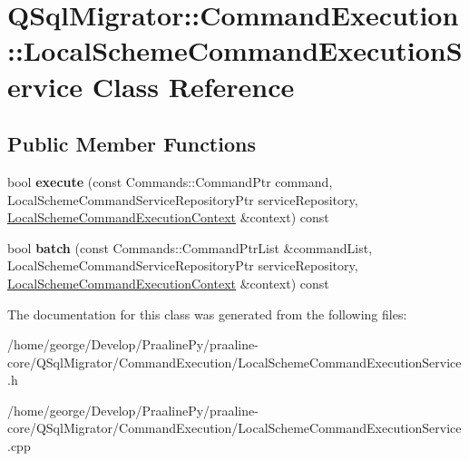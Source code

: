 \hypertarget{class_q_sql_migrator_1_1_command_execution_1_1_local_scheme_command_execution_service}{}\section{Q\+Sql\+Migrator\+:\+:Command\+Execution\+:\+:Local\+Scheme\+Command\+Execution\+Service Class Reference}
\label{class_q_sql_migrator_1_1_command_execution_1_1_local_scheme_command_execution_service}
\subsection*{Public Member Functions}
\begin{DoxyCompactItemize}
\item 
\mbox{\label{class_q_sql_migrator_1_1_command_execution_1_1_local_scheme_command_execution_service_a5e2e14eda3c0941778fa06df87025908}} 
bool {\bfseries execute} (const Commands\+::\+Command\+Ptr command, Local\+Scheme\+Command\+Service\+Repository\+Ptr service\+Repository, \hyperlink{class_q_sql_migrator_1_1_command_execution_1_1_local_scheme_command_execution_context}{Local\+Scheme\+Command\+Execution\+Context} \&context) const
\item 
\mbox{\label{class_q_sql_migrator_1_1_command_execution_1_1_local_scheme_command_execution_service_afee7de7f9c51837b199014e24fe5c6e1}} 
bool {\bfseries batch} (const Commands\+::\+Command\+Ptr\+List \&command\+List, Local\+Scheme\+Command\+Service\+Repository\+Ptr service\+Repository, \hyperlink{class_q_sql_migrator_1_1_command_execution_1_1_local_scheme_command_execution_context}{Local\+Scheme\+Command\+Execution\+Context} \&context) const
\end{DoxyCompactItemize}


The documentation for this class was generated from the following files\+:\begin{DoxyCompactItemize}
\item 
/home/george/\+Develop/\+Praaline\+Py/praaline-\/core/\+Q\+Sql\+Migrator/\+Command\+Execution/Local\+Scheme\+Command\+Execution\+Service.\+h\item 
/home/george/\+Develop/\+Praaline\+Py/praaline-\/core/\+Q\+Sql\+Migrator/\+Command\+Execution/Local\+Scheme\+Command\+Execution\+Service.\+cpp\end{DoxyCompactItemize}
